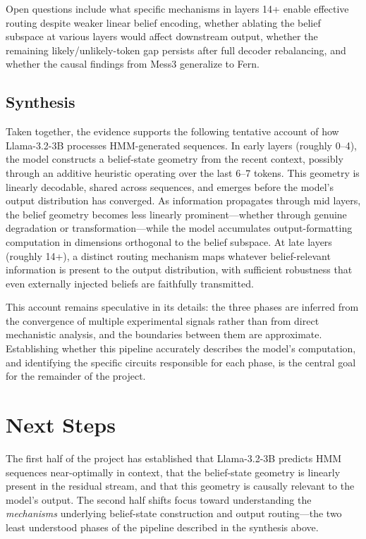 \documentclass[midterm]{sparreport}
\begin{document}
Open questions include what specific mechanisms in layers 14+ enable effective routing despite weaker linear belief encoding, whether ablating the belief subspace at various layers would affect downstream output, whether the remaining likely/unlikely-token gap persists after full decoder rebalancing, and whether the causal findings from Mess3 generalize to Fern.

\subsection{Synthesis}

Taken together, the evidence supports the following tentative account of how Llama-3.2-3B processes HMM-generated sequences. In early layers (roughly 0--4), the model constructs a belief-state geometry from the recent context, possibly through an additive heuristic operating over the last 6--7 tokens. This geometry is linearly decodable, shared across sequences, and emerges before the model's output distribution has converged. As information propagates through mid layers, the belief geometry becomes less linearly prominent---whether through genuine degradation or transformation---while the model accumulates output-formatting computation in dimensions orthogonal to the belief subspace. At late layers (roughly 14+), a distinct routing mechanism maps whatever belief-relevant information is present to the output distribution, with sufficient robustness that even externally injected beliefs are faithfully transmitted.

This account remains speculative in its details: the three phases are inferred from the convergence of multiple experimental signals rather than from direct mechanistic analysis, and the boundaries between them are approximate. Establishing whether this pipeline accurately describes the model's computation, and identifying the specific circuits responsible for each phase, is the central goal for the remainder of the project.

\section{Next Steps}

The first half of the project has established that Llama-3.2-3B predicts HMM sequences near-optimally in context, that the belief-state geometry is linearly present in the residual stream, and that this geometry is causally relevant to the model's output. The second half shifts focus toward understanding the \emph{mechanisms} underlying belief-state construction and output routing---the two least understood phases of the pipeline described in the synthesis above.
\end{document}
